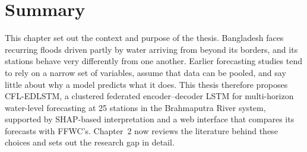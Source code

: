 \section{Summary}
\label{sec:1.13}

This chapter set out the context and purpose of the thesis. Bangladesh faces
recurring floods driven partly by water arriving from beyond its borders, and
its stations behave very differently from one another. Earlier forecasting
studies tend to rely on a narrow set of variables, assume that data can be
pooled, and say little about why a model predicts what it does. This thesis
therefore proposes CFL-EDLSTM, a clustered federated encoder--decoder LSTM for
multi-horizon water-level forecasting at 25 stations in the Brahmaputra River
system, supported by SHAP-based interpretation and a web interface that
compares its forecasts with FFWC's. Chapter~2 now reviews the literature behind
these choices and sets out the research gap in detail.